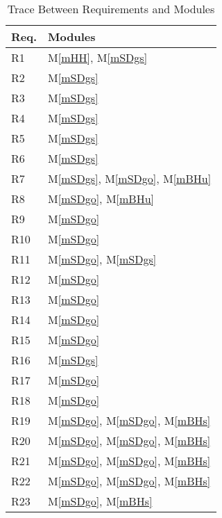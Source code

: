 \documentclass[12pt, titlepage]{article}
\newcommand{\mref}[1]{M\ref{#1}}
\begin{document}
\begin{table}[H]
\centering
\begin{tabular}{p{} p{}}
\toprule
\textbf{Req.} & \textbf{Modules}\\
\midrule


R1 & \mref{mHH}, \mref{mSDgs}\\
R2 & \mref{mSDgs}\\
R3 & \mref{mSDgs}\\
R4 & \mref{mSDgs}\\
R5 & \mref{mSDgs}\\
R6 & \mref{mSDgs}\\
R7 & \mref{mSDgs}, \mref{mSDgo}, \mref{mBHu}\\
R8 & \mref{mSDgo}, \mref{mBHu}\\
R9 & \mref{mSDgo}\\
R10 & \mref{mSDgo}\\
R11 & \mref{mSDgo}, \mref{mSDgs}\\
R12 & \mref{mSDgo}\\
R13 & \mref{mSDgo}\\
R14 & \mref{mSDgo}\\
R15 & \mref{mSDgo}\\
R16 & \mref{mSDgs}\\
R17 & \mref{mSDgo}\\
R18 & \mref{mSDgo}\\
R19 & \mref{mSDgo}, \mref{mSDgo}, \mref{mBHs}\\
R20 & \mref{mSDgo}, \mref{mSDgo}, \mref{mBHs}\\
R21 & \mref{mSDgo}, \mref{mSDgo}, \mref{mBHs}\\
R22 & \mref{mSDgo}, \mref{mSDgo}, \mref{mBHs}\\
R23 & \mref{mSDgo}, \mref{mBHs}\\
\bottomrule
\end{tabular}
\caption{Trace Between Requirements and Modules}
\label{TblRT}
\end{table}
\end{document}
